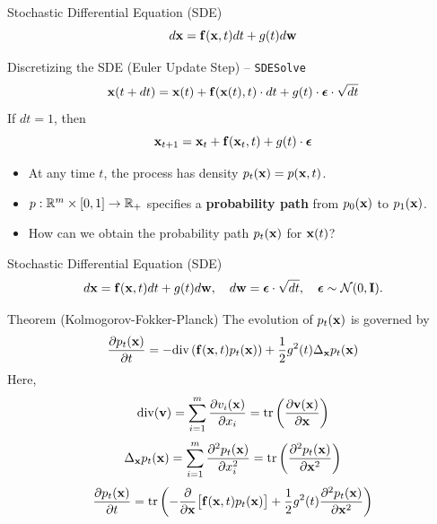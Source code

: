 \documentclass{beamer}
\begin{document}
\begin{frame}{Stochastic Differential Equation (SDE)}
	\[
		d\mathbf{x} = \mathbf{f}(\mathbf{x}, t) dt + g(t) d \mathbf{w}
	\]
	\vspace{-0.3cm}
	\eqpause
	\begin{block}{Discretizing the SDE (Euler Update Step) – \texttt{SDESolve}}
		\vspace{-0.3cm}
		\[
			\mathbf{x}(t + dt) = \mathbf{x}(t) + \mathbf{f}(\mathbf{x}(t), t) \cdot dt + g(t) \cdot \boldsymbol{\epsilon} \cdot \sqrt{dt}
		\]
		If $dt=1$, then
		\vspace{-0.3cm}
		\[
			\mathbf{x}_{t + 1} = \mathbf{x}_t + \mathbf{f}(\mathbf{x}_t, t) + g(t) \cdot \boldsymbol{\epsilon}
		\]
		\vspace{-0.7cm}
	\end{block}
	\eqpause
	\begin{itemize}
		\item At any time $t$, the process has density $p_t(\mathbf{x}) = p(\mathbf{x}, t)$.
		\item $p: \mathbb{R}^m \times [0,1] \rightarrow \mathbb{R}_+$ specifies a \textbf{probability path} from $p_0(\mathbf{x})$ to $p_1(\mathbf{x})$.
		\item How can we obtain the probability path $p_t(\mathbf{x})$ for $\mathbf{x}(t)$?
	\end{itemize}
\end{frame}
\begin{frame}{Stochastic Differential Equation (SDE)}
	\vspace{-0.4cm}
	\[
		d\mathbf{x} = \mathbf{f}(\mathbf{x}, t) dt + g(t) d \mathbf{w},\quad d \mathbf{w} = \boldsymbol{\epsilon} \cdot \sqrt{dt},\quad \boldsymbol{\epsilon} \sim \mathcal{N}(0, \mathbf{I}).
	\]
	\vspace{-0.4cm}
	\begin{block}{Theorem (Kolmogorov-Fokker-Planck)}
		The evolution of $p_t(\mathbf{x})$ is governed by
		\vspace{-0.2cm}
		\[
			\frac{\partial p_t(\mathbf{x})}{\partial t} = - \text{div}\left(\mathbf{f}(\mathbf{x}, t) p_t(\mathbf{x})\right) + \frac{1}{2}g^2(t) \Delta_{\mathbf{x}}p_t(\mathbf{x})
		\]
		\eqpause
		Here,
		\[
			\text{div} (\mathbf{v}) = \sum_{i=1}^m \frac{\partial v_i(\mathbf{x})}{\partial x_i} = \text{tr}\left( \frac{\partial \mathbf{v}(\mathbf{x})}{\partial \mathbf{x}}  \right)
		\]
		\[
			\Delta_{\mathbf{x}}p_t(\mathbf{x}) = \sum_{i=1}^m \frac{\partial^2 p_t(\mathbf{x})}{\partial x_i^2} = \text{tr}\left( \frac{\partial^2 p_t(\mathbf{x})}{\partial \mathbf{x}^2}  \right)
		\]
		\eqpause
		\[
			\frac{\partial p_t(\mathbf{x})}{\partial t} = \text{tr}\left( - \frac{\partial}{\partial \mathbf{x}} \bigl[ \mathbf{f}(\mathbf{x}, t) p_t(\mathbf{x})\bigr] + \frac{1}{2} g^2(t) \frac{\partial^2 p_t(\mathbf{x})}{\partial \mathbf{x}^2} \right)
		\]
	\end{block}
\end{frame}
\end{document}
